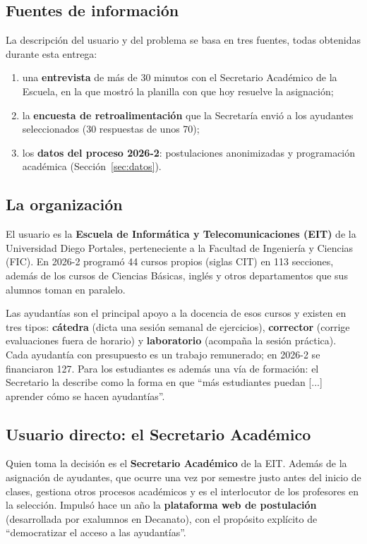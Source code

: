 \documentclass{article}
\begin{document}
\subsection{Fuentes de información}

La descripción del usuario y del problema se basa en tres fuentes, todas obtenidas durante esta entrega:
\begin{enumerate}
    \item una \textbf{entrevista} de más de 30 minutos con el Secretario Académico de la Escuela, en la que mostró la planilla con que hoy resuelve la asignación;
    \item la \textbf{encuesta de retroalimentación} que la Secretaría envió a los ayudantes seleccionados (30 respuestas de unos 70);
    \item los \textbf{datos del proceso 2026-2}: postulaciones anonimizadas y programación académica (Sección~\ref{sec:datos}).
\end{enumerate}

\subsection{La organización}

El usuario es la \textbf{Escuela de Informática y Telecomunicaciones (EIT)} de la Universidad Diego Portales, perteneciente a la Facultad de Ingeniería y Ciencias (FIC). En 2026-2 programó 44 cursos propios (siglas CIT) en 113 secciones, además de los cursos de Ciencias Básicas, inglés y otros departamentos que sus alumnos toman en paralelo.

Las ayudantías son el principal apoyo a la docencia de esos cursos y existen en tres tipos: \textbf{cátedra} (dicta una sesión semanal de ejercicios), \textbf{corrector} (corrige evaluaciones fuera de horario) y \textbf{laboratorio} (acompaña la sesión práctica). Cada ayudantía con presupuesto es un trabajo remunerado; en 2026-2 se financiaron 127. Para los estudiantes es además una vía de formación: el Secretario la describe como la forma en que ``más estudiantes puedan [...] aprender cómo se hacen ayudantías''.

\subsection{Usuario directo: el Secretario Académico}

Quien toma la decisión es el \textbf{Secretario Académico} de la EIT. Además de la asignación de ayudantes, que ocurre una vez por semestre justo antes del inicio de clases, gestiona otros procesos académicos y es el interlocutor de los profesores en la selección. Impulsó hace un año la \textbf{plataforma web de postulación} (desarrollada por exalumnos en Decanato), con el propósito explícito de ``democratizar el acceso a las ayudantías''.
\end{document}
